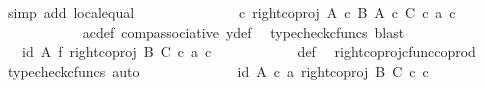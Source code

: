 \begin{isabellebody}
\ {\isacharparenleft}{\kern0pt}simp\ add{\isacharcolon}{\kern0pt}\ local{\isachardot}{\kern0pt}equal{\isacharparenright}{\kern0pt}\isanewline
\ \ \ \ \ \ \ \ \isamarkupfalse%
\ \isamarkupfalse%
\ {\isachardoublequoteopen}{\isachardot}{\kern0pt}{\isachardot}{\kern0pt}{\isachardot}{\kern0pt}\ {\isacharequal}{\kern0pt}\ {\isacharparenleft}{\kern0pt}{\isasymphi}\ {\isasymcirc}\isactrlsub c\ right{\isacharunderscore}{\kern0pt}coproj\ {\isacharparenleft}{\kern0pt}A\ {\isasymtimes}\isactrlsub c\ B{\isacharparenright}{\kern0pt}\ {\isacharparenleft}{\kern0pt}A\ {\isasymtimes}\isactrlsub c\ C{\isacharparenright}{\kern0pt}{\isacharparenright}{\kern0pt}\ {\isasymcirc}\isactrlsub c\ {\isasymlangle}a{\isacharprime}{\kern0pt}{\isacharcomma}{\kern0pt}\ c{\isacharprime}{\kern0pt}{\isasymrangle}{\isachardoublequoteclose}\isanewline
\ \ \ \ \ \ \ \ \ \ \isamarkupfalse%
\ a{\isacharprime}{\kern0pt}c{\isacharprime}{\kern0pt}{\isacharunderscore}{\kern0pt}def\ comp{\isacharunderscore}{\kern0pt}associative{}\ y{\isacharprime}{\kern0pt}{\isacharunderscore}{\kern0pt}def\ \isamarkupfalse%
\ {\isacharparenleft}{\kern0pt}typecheck{\isacharunderscore}{\kern0pt}cfuncs{\isacharcomma}{\kern0pt}\ blast{\isacharparenright}{\kern0pt}\isanewline
\ \ \ \ \ \ \ \ \ \ \isamarkupfalse%
\ \isamarkupfalse%
\ {\isachardoublequoteopen}{\isachardot}{\kern0pt}{\isachardot}{\kern0pt}{\isachardot}{\kern0pt}\ {\isacharequal}{\kern0pt}\ {\isacharparenleft}{\kern0pt}id\ A\ {\isasymtimes}\isactrlsub f\ right{\isacharunderscore}{\kern0pt}coproj\ B\ C{\isacharparenright}{\kern0pt}\ {\isasymcirc}\isactrlsub c\ {\isasymlangle}a{\isacharprime}{\kern0pt}{\isacharcomma}{\kern0pt}\ c{\isacharprime}{\kern0pt}{\isasymrangle}{\isachardoublequoteclose}\isanewline
\ \ \ \ \ \ \ \ \ \ \isamarkupfalse%
\ {\isasymphi}{\isacharunderscore}{\kern0pt}def\ \isamarkupfalse%
\ right{\isacharunderscore}{\kern0pt}coproj{\isacharunderscore}{\kern0pt}cfunc{\isacharunderscore}{\kern0pt}coprod\ \isamarkupfalse%
\ {\isacharparenleft}{\kern0pt}typecheck{\isacharunderscore}{\kern0pt}cfuncs{\isacharcomma}{\kern0pt}\ auto{\isacharparenright}{\kern0pt}\isanewline
\ \ \ \ \ \ \ \ \isamarkupfalse%
\ \isamarkupfalse%
\ {\isachardoublequoteopen}{\isachardot}{\kern0pt}{\isachardot}{\kern0pt}{\isachardot}{\kern0pt}\ {\isacharequal}{\kern0pt}\ {\isasymlangle}id\ A\ {\isasymcirc}\isactrlsub c\ a{\isacharprime}{\kern0pt}{\isacharcomma}{\kern0pt}\ right{\isacharunderscore}{\kern0pt}coproj\ B\ C\ {\isasymcirc}\isactrlsub c\ c{\isacharprime}{\kern0pt}{\isasymrangle}{\isachardoublequoteclose}\isanewline

\end{isabellebody}
